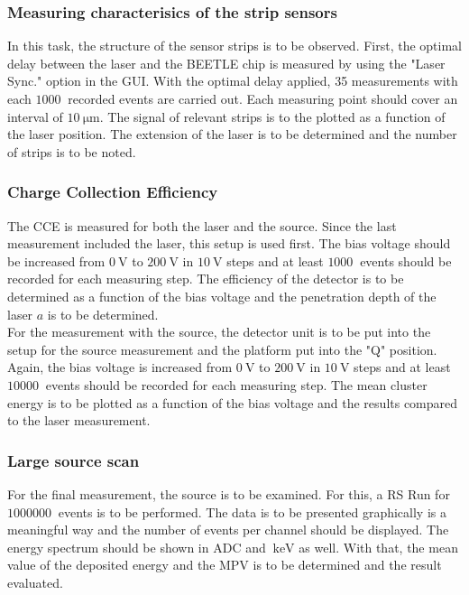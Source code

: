 \subsubsection{Measuring characterisics of the strip sensors}
\label{measure:4}
In this task, the structure of the sensor strips is to be observed. First, the optimal delay between the laser
and the BEETLE chip is measured by using the "Laser Sync." option in the GUI. With the optimal delay applied, 
35 measurements with each $\qty{1000}{}$ recorded events are carried out. Each measuring point should cover an interval
of $\qty{10}{\micro\metre}$. The signal of relevant strips is to the plotted as a function of the laser position. 
The extension of the laser is to be determined and the number of strips is to be noted.

\subsubsection{Charge Collection Efficiency}
\label{measure:5}
The CCE is measured for both the laser and the source. Since the last measurement included the laser, this setup is used
first. The bias voltage should be increased from $\qty{0}{\volt}$ to $\qty{200}{\volt}$ in $\qty{10}{\volt}$ steps and 
at least $\qty{1000}{}$ events should be recorded for each measuring step. The efficiency of the detector is to be determined
as a function of the bias voltage and the penetration depth of the laser $a$ is to be determined.\\
For the measurement with the source, the detector unit is to be put into the setup for the source measurement and the platform
put into the "Q" position. Again, the bias voltage is increased from $\qty{0}{\volt}$ to $\qty{200}{\volt}$ in $\qty{10}{\volt}$ steps
and at least $\qty{10000}{}$ events should be recorded for each measuring step. The mean cluster energy is to be plotted as a function
of the bias voltage and the results compared to the laser measurement.

\subsubsection{Large source scan}
\label{measure:6}
For the final measurement, the source is to be examined. For this, a RS Run for $\qty{1000000}{}$ events is to be performed.
The data is to be presented graphically is a meaningful way and the number of events per channel should be displayed.
The energy spectrum should be shown in ADC and $\qty{}{\kilo\electronvolt}$ as well. With that, the mean value of the 
deposited energy and the MPV is to be determined and the result evaluated.
